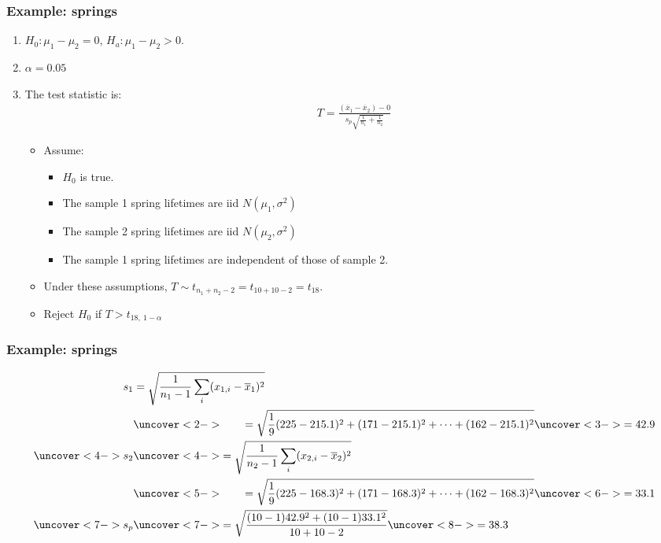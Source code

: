 \documentclass[handout]{beamer}\usepackage[]{graphicx}\usepackage[]{color}
\providecommand{\ov}[1]{\overline{#1}}
\numberwithin{equation}{section}
\begin{document}
\begin{frame}
\frametitle{Example: springs}
\begin{enumerate}[1. ]
\item $H_0:  \mu_1 - \mu_2 = 0$, $H_a: \mu_1 - \mu_2 > 0$.
\pause \item $\alpha = 0.05$
\pause \item The test statistic is:
\pause \begin{align*}
T = \frac{(\ov{x}_1 - \ov{x}_2) - 0}{s_p \sqrt{\frac{1}{n_1} + \frac{1}{n_2}}}
\end{align*}
\begin{itemize}
\pause \item Assume:
\begin{itemize}
\pause \item $H_0$ is true.
\pause \item The sample 1 spring lifetimes are iid $N(\mu_1, \sigma^2)$
\pause \item The sample 2 spring lifetimes are iid $N(\mu_2, \sigma^2)$
\pause \item The sample 1 spring lifetimes are independent of those of sample 2.
\end{itemize}
\pause \item Under these assumptions, $T \sim t_{n_1 + n_2 - 2} = t_{10 + 10 - 2} = t_{18}$.
\pause \item Reject $H_0$ if $T > t_{18, \ 1 - \alpha}$
\end{itemize}
\setcounter{saveenum}{\value{enumi}}

\end{enumerate}
\end{frame}

\begin{frame}
\frametitle{Example: springs} \scriptsize
\begin{align*}
s_1 &= \sqrt{\frac{1}{n_1 - 1} \sum_i (x_{1, i} - \ov{x}_1)^2} \\
&\uncover<2->{ \qquad = \sqrt{\frac{1}{9} (225 - 215.1)^2 + (171 - 215.1)^2 + \cdots + (162 - 215.1)^2}}\uncover<3->{ = 42.9 }\\
\uncover<4->{s_2} & \uncover<4->{= \sqrt{\frac{1}{n_2 - 1} \sum_i (x_{2, i} - \ov{x}_2)^2}}\\
& \uncover<5->{\qquad = \sqrt{\frac{1}{9} (225 - 168.3)^2 + (171 - 168.3)^2 + \cdots + (162 - 168.3)^2}} \uncover<6->{= 33.1}\\
\uncover<7->{s_p} &\uncover<7->{= \sqrt{ \frac{(10-1)42.9^2+ (10-1)33.1^2}{10 + 10 - 2}}} \uncover<8->{= 38.3}
\end{align*}
\end{frame}
\end{document}
